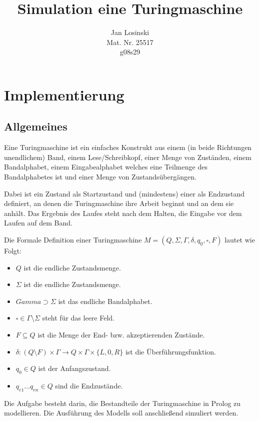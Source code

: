 \documentclass[final,a4paper,11pt,notitlepage,halfparskip]{scrreprt}
\title{Simulation eine Turingmaschine}
\author{Jan Losinski\\
\small{Mat. Nr. 25517}\\
\small{g08s29}}
\begin{document}
\maketitle

\tableofcontents

\chapter{Implementierung}
\section{Allgemeines}
Eine Turingmaschine ist ein einfaches Konstrukt aus einem (in beide 
Richtungen unendlichem) Band, einem Lese/Schreibkopf, einer Menge von
Zuständen, einem Bandalphabet, einem Eingabealphabet welches eine
Teilmenge des Bandalphabetes ist und einer Menge von Zustandsübergängen.

Dabei ist ein Zustand als Startzustand und (mindestens) einer als
Endzustand definiert, an denen die Turingmaschine ihre Arbeit beginnt
und an dem sie anhält. Das Ergebnis des Laufes steht nach dem Halten, 
die Eingabe vor dem Laufen auf dem Band.

Die Formale Definition einer Turingmaschine $M=(Q, \Sigma, \Gamma,
\delta, q_0, \square, F)$ lautet wie Folgt:

\begin{itemize}
    \item  $Q$ ist die endliche Zustandsmenge.
    \item  $\Sigma$ ist die endliche Zustandsmenge.
    \item  $Gamma \supset \Sigma$ ist das endliche Bandalphabet.
    \item  $\square \in \Gamma\setminus\Sigma$ steht für das leere Feld.
    \item  $F \subseteq Q$ ist die Menge der End- bzw. akzeptierenden Zustände.
    \item  $\delta: (Q \setminus F)\times \Gamma \rightarrow Q \times
	\Gamma \times \{ L, 0, R \}$ ist die Überführungsfunktion.
    \item  $q_0 \in Q$ ist der Anfangszustand.  	
    \item  $q_{e1} \dots q_{en} \in Q$ sind die Endzustände.  	
\end{itemize}

Die Aufgabe besteht darin, die Bestandteile der Turingmaschine in Prolog
zu modellieren. Die Ausführung des Modells soll anschließend simuliert
werden.
\end{document}
